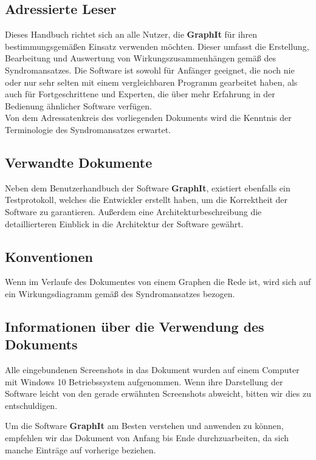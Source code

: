\documentclass[enabledeprecatedfontcommands,fontsize=11pt,paper=a4,twoside]{scrartcl}
\newcounter{one}
\newcounter{two}[one]
\let\tempone\itemize
\let\temptwo\enditemize
\renewenvironment{itemize}{\tempone\addtolength{\itemsep}{-10.0pt}}{\temptwo}
\begin{document}
\subsection{Adressierte Leser}
Dieses Handbuch richtet sich an alle Nutzer, die \textbf{GraphIt} für ihren bestimmungsgemäßen Einsatz verwenden möchten. Dieser umfasst die Erstellung, Bearbeitung und Auswertung von Wirkungszusammenhängen gemäß des Syndromansatzes. Die Software ist sowohl für Anfänger geeignet, die noch nie oder nur sehr selten mit einem vergleichbaren Programm gearbeitet haben, als auch für Fortgeschrittene und Experten, die über mehr Erfahrung in der Bedienung ähnlicher Software verfügen. \\
Von dem Adressatenkreis des vorliegenden Dokuments wird die Kenntnis der Terminologie des Syndromansatzes erwartet.  
\subsection{Verwandte Dokumente}
Neben dem Benutzerhandbuch der Software \textbf{GraphIt}, existiert ebenfalls ein Testprotokoll, welches die Entwickler erstellt haben, um die Korrektheit der Software zu garantieren. Außerdem eine Architekturbeschreibung die detaillierteren Einblick in die Architektur der Software gewährt. 
\subsection{Konventionen}
\begin{itemize}
	\item Wenn im Verlaufe des Dokumentes von einem Graphen die Rede ist, wird sich auf ein Wirkungsdiagramm  gemäß des Syndromansatzes bezogen.
\end{itemize}

\subsection{Informationen über die Verwendung des Dokuments}

\begin{itemize}
	\item Alle eingebundenen Screenshots in das Dokument wurden auf einem Computer mit Windows 10 Betriebssystem aufgenommen. Wenn ihre Darstellung der Software leicht von den gerade erwähnten Screenshots abweicht, bitten wir dies zu entschuldigen.
	\item Um die Software \textbf{GraphIt} am Besten verstehen und anwenden zu können, empfehlen wir das Dokument von Anfang bis Ende durchzuarbeiten, da sich manche Einträge auf vorherige beziehen. 
\end{itemize}
\end{document}
